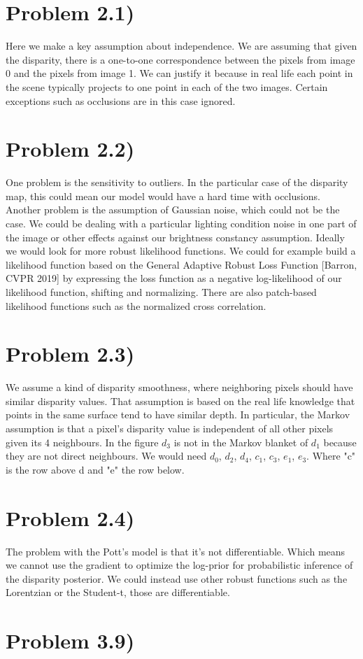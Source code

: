 \documentclass[11pt]{article} %
\begin{document}
	\section*{Problem 2.1)}
 Here we make a key assumption about  independence. We are assuming that given the disparity, there is a one-to-one correspondence between the pixels from image 0 and the pixels from image 1. We can justify it because in real life each point in the scene typically projects to one point in each of the two images. Certain exceptions such as occlusions are in this case ignored.
	
	\section*{Problem 2.2)}
 One problem is the sensitivity to outliers. In the particular case of the disparity map, this could mean our model would have a hard time with  occlusions. Another problem is the assumption of Gaussian noise, which could not be the case. We could be dealing with a particular lighting condition noise in one part of the image or other effects against our brightness constancy assumption.  Ideally we would look for more robust likelihood functions. We could for example build a likelihood function based on the General Adaptive Robust Loss Function [Barron, CVPR 2019] by expressing the loss function as a negative log-likelihood of our likelihood function, shifting and normalizing. There are also patch-based likelihood functions such as the normalized cross correlation.

	\section*{Problem 2.3)}
 We assume a kind of disparity smoothness, where neighboring pixels should have similar disparity values. That assumption is based on the real life knowledge that points in the same surface tend to have similar depth. In particular, the Markov assumption is that a pixel's disparity value is independent of all other pixels given its 4 neighbours. In the figure ${d}_{3}$ is not in the Markov blanket of ${d}_{1}$ because they are not direct neighbours. We would need ${d}_{0}$, ${d}_{2}$, ${d}_{4}$, ${c}_{1}$, ${c}_{3}$, ${e}_{1}$, ${e}_{3}$. Where "c" is the row above d and "e" the row below.

	\section*{Problem 2.4)}
 The problem with the Pott's model is that it's not differentiable. Which means we cannot use the gradient to optimize the log-prior for probabilistic inference of the disparity posterior. We could instead use other robust functions such as the Lorentzian or the Student-t, those are differentiable.
 
 	\section*{Problem 3.9)}
	
\end{document}
